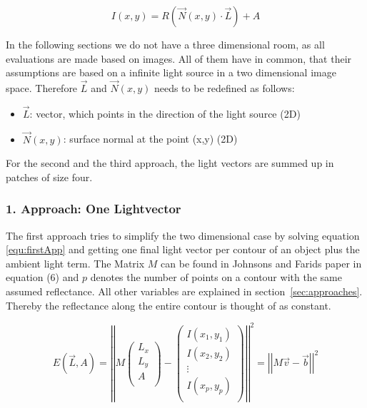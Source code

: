 \begin{equation}
\label{equ:General}
I(x,y) = R(\vec{N}(x,y)\cdot \vec{L}) + A
\end{equation}

In the following sections we do not have a three dimensional room, as all evaluations are made based on images. All of them have in common, that their assumptions are based on a infinite light source in a two dimensional image space. Therefore $\vec{L}$ and $\vec{N}(x,y)$ needs to be redefined as follows:
\begin{itemize}
\item $\vec{L}$: vector, which points in the direction of the light source (2D)
\item $\vec{N}(x,y)$: surface normal at the point (x,y) (2D)
\end{itemize}

For the second and the third approach, the light vectors are summed up in patches of size four. 

\subsubsection{1. Approach: One Lightvector}\label{sec:appOne}
The first approach tries to simplify the two dimensional case by solving equation \ref{equ:firstApp} and getting one final light vector per contour of an object plus the ambient light term. The Matrix $M$ can be found in Johnsons and Farids paper \cite{Johnson} in equation (6) and $p$ denotes the number of points on a contour with the same assumed reflectance. All other variables are explained in section~\ref{sec:approaches}. Thereby the reflectance along the entire contour is thought of as constant. 

\begin{equation}
\label{equ:firstApp}
E(\vec{L} , A) = 
\left\vert \left\vert 
M
\begin{pmatrix}
L_{x} \\
L_{y} \\
A \\
\end{pmatrix} -
\begin{pmatrix}
I(x_{1} , y_{1}) \\
I(x_{2} , y_{2}) \\
\vdots \\
I(x_{p} , y_{p}) \\
\end{pmatrix}
 \right\vert\right\vert^{2}
 = \left\vert \left\vert  M\vec{v}-\vec{b}  \right\vert\right\vert^{2}
\end{equation}

